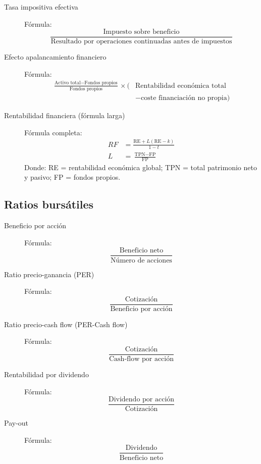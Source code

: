 \documentclass[12pt]{book} %
\begin{document}
\begin{description}
\item[Tasa impositiva efectiva]
Fórmula: $$\displaystyle \frac{\text{Impuesto sobre beneficio}}{\text{Resultado por operaciones continuadas antes de impuestos}}$$

\item[Efecto apalancamiento financiero]
Fórmula:
\[
\begin{aligned}
\frac{\text{Activo total} - \text{Fondos propios}}{\text{Fondos propios}}
\times \bigl(&\text{Rentabilidad económica total} \\
           &- \text{coste financiación no propia}\bigr)
\end{aligned}
\]

\item[Rentabilidad financiera (fórmula larga)]
Fórmula completa:
\[
\begin{aligned}
RF &= \frac{\text{RE} + L\left(\text{RE} - k\right)}{1 - t} \\[0.4em]
L  &= \frac{\text{TPN} - \text{FP}}{\text{FP}}
\end{aligned}
\]
Donde: RE = rentabilidad económica global; TPN = total patrimonio neto y pasivo; FP = fondos propios.

\end{description}

\subsection*{Ratios bursátiles}
\begin{description}
\item[Beneficio por acción]
Fórmula: $$\displaystyle \frac{\text{Beneficio neto}}{\text{Número de acciones}}$$

\item[Ratio precio-ganancia (PER)]
Fórmula: $$\displaystyle \frac{\text{Cotización}}{\text{Beneficio por acción}}$$

\item[Ratio precio-cash flow (PER-Cash flow)]
Fórmula: $$\displaystyle \frac{\text{Cotización}}{\text{Cash-flow por acción}}$$

\item[Rentabilidad por dividendo]
Fórmula: $$\displaystyle \frac{\text{Dividendo por acción}}{\text{Cotización}}$$

\item[Pay-out]
Fórmula: $$\displaystyle \frac{\text{Dividendo}}{\text{Beneficio neto}}$$
\end{description}
\end{document}
